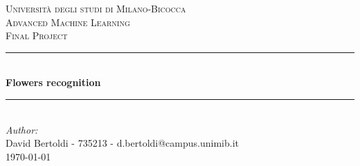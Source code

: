 \begin{titlepage}

\newcommand{\HRule}{\rule{\linewidth}{0.5mm}} %

\center %
 

\textsc{\LARGE Università degli studi di Milano-Bicocca}\\[1cm] %
\textsc{\Large Advanced Machine Learning }\\[0.3cm] %
\textsc{\large Final Project}\\[0.1cm] %


\HRule \\[0.4cm]
{ \huge \bfseries Flowers recognition}\\[0.4cm] %
\HRule \\[1.5cm]
 

\large
\emph{Author:}\\
David Bertoldi - 735213 - d.bertoldi@campus.unimib.it \\[1cm]  %




{\large \today}\\[2cm] %


\end{titlepage}
